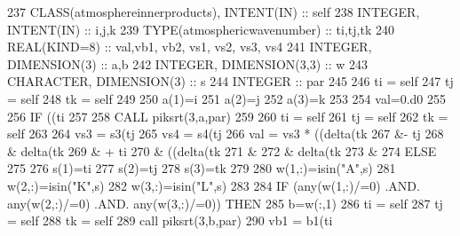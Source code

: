\begin{DoxyCode}
237     \textcolor{keywordtype}{CLASS}(atmosphereinnerproducts), \textcolor{keywordtype}{INTENT(IN)} :: self
238     \textcolor{keywordtype}{INTEGER}, \textcolor{keywordtype}{INTENT(IN)} :: i,j,k
239     \textcolor{keywordtype}{TYPE}(atmosphericwavenumber) :: ti,tj,tk
240     \textcolor{keywordtype}{REAL(KIND=8)} :: val,vb1, vb2, vs1, vs2, vs3, vs4
241     \textcolor{keywordtype}{INTEGER}, \textcolor{keywordtype}{DIMENSION(3)} :: a,b
242     \textcolor{keywordtype}{INTEGER}, \textcolor{keywordtype}{DIMENSION(3,3)} :: w
243     \textcolor{keywordtype}{CHARACTER}, \textcolor{keywordtype}{DIMENSION(3)} :: s
244     \textcolor{keywordtype}{INTEGER} :: par
245 
246     ti = self%
247     tj = self%
248     tk = self%
249 
250     a(1)=i
251     a(2)=j
252     a(3)=k
253 
254     val=0.d0
255 
256     \textcolor{keywordflow}{IF} ((ti%
257        
258       \textcolor{keyword}{CALL }piksrt(3,a,par)
259 
260       ti = self%
261       tj = self%
262       tk = self%
263 
264       vs3 = s3(tj%
265       vs4 = s4(tj%
266       val = vs3 * ((delta(tk%
267         &- tj%
268         & delta(tk%
269         & + ti%
270         & ((delta(tk%
271         &%
272         & delta(tk%
273         &%
274     \textcolor{keywordflow}{ELSE}
275 
276       s(1)=ti%
277       s(2)=tj%
278       s(3)=tk%
279 
280       w(1,:)=isin(\textcolor{stringliteral}{"A"},s)
281       w(2,:)=isin(\textcolor{stringliteral}{"K"},s)
282       w(3,:)=isin(\textcolor{stringliteral}{"L"},s)
283 
284       \textcolor{keywordflow}{IF} (any(w(1,:)/=0) .AND. any(w(2,:)/=0) .AND. any(w(3,:)/=0)) \textcolor{keywordflow}{THEN}
285         b=w(:,1)
286         ti = self%
287         tj = self%
288         tk = self%
289         \textcolor{keyword}{call }piksrt(3,b,par)
290         vb1 = b1(ti%

\end{DoxyCode}
